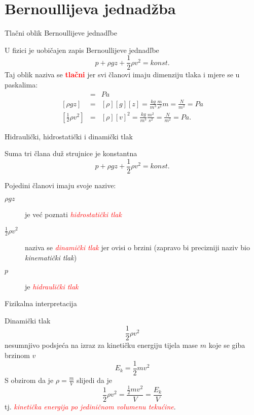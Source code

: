\documentclass[croatian]{beamer}
\begin{document}
\section{Bernoullijeva jednadžba}

\begin{frame}{Tlačni oblik Bernoullijeve jednadľbe}

U fizici je uobičajen zapis Bernoullijeve jednadľbe
\[
p+\rho gz+\frac{1}{2}\rho v^{2}=konst.
\]
Taj oblik naziva se \textbf{\textcolor{red}{tlačni}} jer svi članovi
imaju dimenziju tlaka i mjere se u paskalima:
\begin{eqnarray*}
[p] & = & Pa\\
{}[\rho gz] & = & [\rho][g][z]=\frac{kg}{m^{3}}\frac{m}{s^{2}}m=\frac{N}{m^{2}}=Pa\\
{}[\frac{1}{2}\rho v^{2}] & = & [\rho][v]^{2}=\frac{kg}{m^{3}}\frac{m^{2}}{s^{2}}=\frac{N}{m^{2}}=Pa.
\end{eqnarray*}
\end{frame}

\begin{frame}{Hidraulički, hidrostatički i dinamički tlak}

Suma tri člana duž strujnice je konstantna
\[
p+\rho gz+\frac{1}{2}\rho v^{2}=konst.
\]
\begin{block}{Pojedini članovi imaju svoje nazive:}
\begin{description}
\item [{$\rho gz$}] je već poznati \textcolor{red}{\emph{hidrostatički
tlak}}
\item [{$\frac{1}{2}\rho v^{2}$}] naziva se \textcolor{red}{\emph{dinamički
tlak}} jer ovisi o brzini (zapravo bi precizniji naziv bio \emph{kinematički
tlak})
\item [{$p$}] je \textcolor{red}{\emph{hidraulički tlak}}
\end{description}
\end{block}
\end{frame}

\begin{frame}{Fizikalna interpretacija}

Dinamički tlak
\[
\frac{1}{2}\rho v^{2}
\]
nesumnjivo podsjeća na izraz za kinetičku energiju tijela mase $m$
koje se giba brzinom $v$
\[
E_{k}=\frac{1}{2}mv^{2}
\]
S obzirom da je $\rho=\frac{m}{V}$ slijedi da je
\[
\frac{1}{2}\rho v^{2}=\frac{\frac{1}{2}mv^{2}}{V}=\frac{E_{k}}{V}
\]
tj. \textcolor{red}{\emph{kinetička energija po jediničnom volumenu
tekućine}}.
\end{frame}
\end{document}
